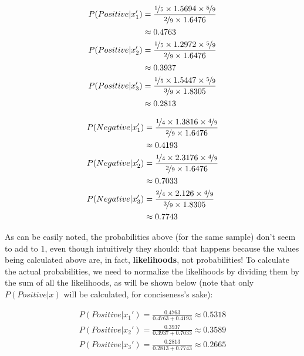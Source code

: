 \documentclass[12pt]{article}
\begin{document}
\begin{enumerate}[leftmargin=\labelsep]
        \begin{multicols}{2}
          \setlength{\columnseprule}{1pt}
          \def\columnseprulecolor{\color{black}}
          \centering

          \begin{align*}
            P(Positive | x_1') & = \frac{\nicefrac{1}{5} \times 1.5694 \times \nicefrac{5}{9}}{\nicefrac{2}{9} \times 1.6476} \\ &\approx 0.4763  \\
            P(Positive | x_2') & = \frac{\nicefrac{1}{5} \times 1.2972 \times \nicefrac{5}{9}}{\nicefrac{2}{9} \times 1.6476} \\ &\approx 0.3937 \\
            P(Positive | x_3') & = \frac{\nicefrac{1}{5} \times 1.5447 \times \nicefrac{5}{9}}{\nicefrac{3}{9} \times 1.8305} \\ &\approx 0.2813
          \end{align*}

          \columnbreak
          \begin{align*}
            P(Negative | x_1') & = \frac{\nicefrac{1}{4} \times 1.3816 \times \nicefrac{4}{9}}{\nicefrac{2}{9} \times 1.6476} \\ &\approx 0.4193  \\
            P(Negative | x_2') & = \frac{\nicefrac{1}{4} \times 2.3176 \times \nicefrac{4}{9}}{\nicefrac{2}{9} \times 1.6476} \\ &\approx 0.7033 \\
            P(Negative | x_3') & = \frac{\nicefrac{2}{4} \times 2.126 \times \nicefrac{4}{9}}{\nicefrac{3}{9} \times 1.8305}  \\ &\approx 0.7743
          \end{align*}

        \end{multicols}

        As can be easily noted, the probabilities above (for the same sample) don't seem to add to $1$,
        even though intuitively they should: that happens because the values being
        calculated above are, in fact, \textbf{likelihoods}, not probabilities!
        To calculate the actual probabilities, we need to normalize the likelihoods
        by dividing them by the sum of all the likelihoods, as will be shown below
        (note that only $P(Positive | x)$ will be calculated, for conciseness's sake):

        \begin{align*}
          P(Positive | x_1') = \frac{0.4763}{0.4763 + 0.4193} \approx 0.5318 \\
          P(Positive | x_2') = \frac{0.3937}{0.3937 + 0.7033} \approx 0.3589 \\
          P(Positive | x_3') = \frac{0.2813}{0.2813 + 0.7743} \approx 0.2665
        \end{align*}


\end{enumerate}
\end{document}
